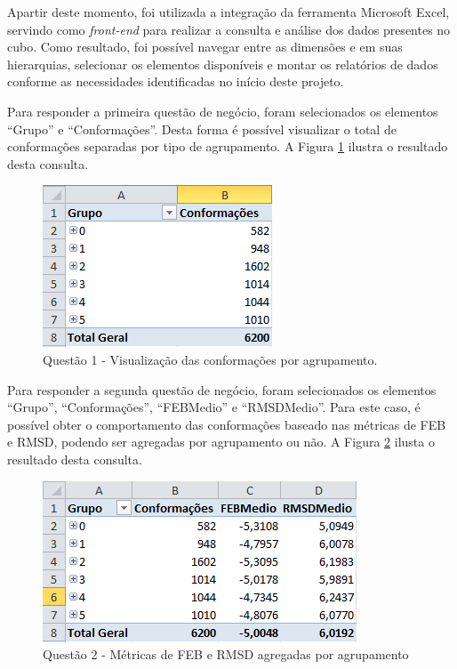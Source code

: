Apartir deste momento, foi utilizada a integração da ferramenta Microsoft Excel, servindo como \emph{front-end} para realizar a consulta e análise dos dados presentes no cubo. Como resultado, foi possível navegar entre as dimensões e em suas hierarquias, selecionar os elementos disponíveis e montar os relatórios de dados conforme as necessidades identificadas no início deste projeto. 

Para responder a primeira questão de negócio, foram selecionados os elementos ``Grupo'' e ``Conformações''. Desta forma é possível visualizar o total de conformações separadas por tipo de agrupamento. A Figura \ref{fig:questao1} ilustra o resultado desta consulta.

\begin{figure}[h]
        \center
        \includegraphics[scale=1]{images/Questao1.PNG}
        \caption{Questão 1 - Visualização das conformações por agrupamento.}
        \label{fig:questao1}
\end{figure}

Para responder a segunda questão de negócio, foram selecionados os elementos ``Grupo'', ``Conformações'', ``FEBMedio'' e ``RMSDMedio''. Para este caso, é possível obter o comportamento das conformações baseado nas métricas de FEB e RMSD, podendo ser agregadas por agrupamento ou não. A Figura \ref{fig:questao2} ilusta o resultado desta consulta.

\begin{figure}[h]
        \center
        \includegraphics[scale=0.8]{images/Questao2.PNG}
        \caption{Questão 2 - Métricas de FEB e RMSD agregadas por agrupamento}
        \label{fig:questao2}
\end{figure}

